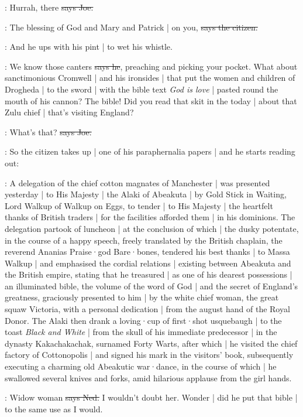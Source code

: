 \joe:
Hurrah,
there
\sout{says Joe.}

\citizen:
The blessing of God and Mary and Patrick |
on you,
\sout{says the citizen.}

\Nq:
And he ups with his pint |
to wet his whistle.

\citizen:
We know those canters
\sout{says he},
preaching and picking your pocket.
What about sanctimonious Cromwell |
and his ironsides |
that put the women and children of Drogheda |
to the sword |
with the bible text \emph{God is love} |
pasted round the mouth of his cannon?
The bible!
Did you read that skit in the  today
 |
about that Zulu chief |
that's visiting England?

\joe:
What's that?
\sout{says Joe.}

\Nq:
So the citizen takes up |
one of his paraphernalia papers |
and he starts reading out:

\citizen:
A delegation of the chief cotton magnates of Manchester |
was presented yesterday |
to His Majesty |
the Alaki of Abeakuta |
by Gold Stick in Waiting,
Lord Walkup of Walkup on Eggs,
to tender |
to His Majesty |
the heartfelt thanks of British traders |
for the facilities afforded them |
in his dominions.
The delegation partook of luncheon |
at the conclusion of which |
the dusky potentate,
in the course of a happy speech,
freely translated by the British chaplain,
the reverend Ananias Praise·god Bare·bones,
tendered his best thanks |
to Massa Walkup |
and emphasised the cordial relations |
existing between Abeakuta and the British empire,
stating that he treasured |
as one of his dearest possessions |
an illuminated bible,
the volume of the word of God |
and the secret of England's greatness,
graciously presented to him |
by the white chief woman,
the great squaw Victoria,
with a personal dedication |
from the august hand of the Royal Donor.
The Alaki then drank a loving·cup of first·shot usquebaugh |
to the toast \emph{Black and White} |
from the skull of his immediate predecessor |
in the dynasty Kakachakachak,
surnamed Forty Warts,
after which |
he visited the chief factory of Cottonopolis |
and signed his mark in the visitors' book,
subsequently executing a charming old Abeakutic war·dance,
in the course of which |
he swallowed several knives and forks,
amid hilarious applause from the girl hands.

\lambert:
Widow woman
\sout{says Ned.}
I wouldn't doubt her.
Wonder |
did he put that bible |
to the same use as I would.

